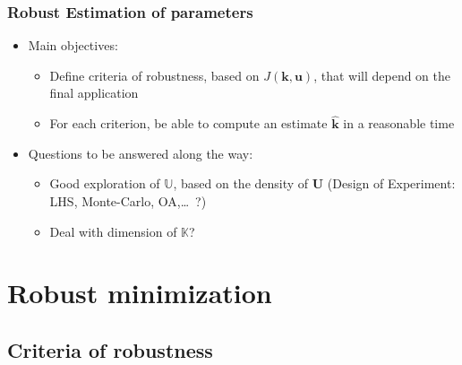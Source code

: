 \documentclass[11pt]{beamer}
\newcommand{\Uspace}{\mathbb{U}}
\newcommand{\Kspace}{\mathbb{K}}
\begin{document}
\begin{frame}
  \frametitle{Robust Estimation of parameters}
  \begin{itemize}
    \item Main objectives:
    \begin{itemize}
    \item Define criteria of robustness, based on $J(\bm{k},\bm{u})$, that will depend on the final application
    \item For each criterion, be able to compute an estimate $\hat{\bm{k}}$ in a reasonable time
    \end{itemize}
  \item Questions to be answered along the way:
    \begin{itemize}
    \item Good exploration of $\Uspace$, based on the density of $\bm{U}$ (Design of Experiment: LHS, Monte-Carlo, OA,\dots~?)
    \item Deal with dimension of $\Kspace$?
    \end{itemize}
  \end{itemize}
\end{frame}





\section{Robust minimization}

\subsection{Criteria of robustness}
\end{document}
